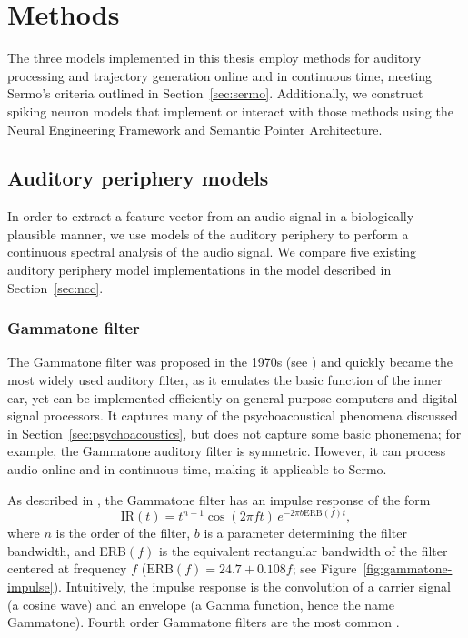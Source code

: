 \chapter{Methods}
\label{chapt:methods}

The three models implemented
in this thesis employ methods
for auditory processing
and trajectory generation
online and in continuous time,
meeting Sermo's criteria
outlined in Section~\ref{sec:sermo}.
Additionally,
we construct spiking neuron models
that implement or interact with those methods
using the Neural Engineering Framework
and Semantic Pointer Architecture.

\section{Auditory periphery models}
\label{sec:periphery-models}

In order to extract a feature vector
from an audio signal
in a biologically plausible manner,
we use models of the auditory periphery
to perform a continuous spectral analysis
of the audio signal.
We compare five existing
auditory periphery model implementations
in the model described in
Section~\ref{sec:ncc}.

\subsection{Gammatone filter}

The Gammatone filter was proposed
in the 1970s
(see \citealt{johannesma1972,deboer1975,patterson1976})
and quickly became
the most widely used auditory filter,
as it emulates the basic function
of the inner ear,
yet can be implemented efficiently
on general purpose computers
and digital signal processors.
It captures many of the
psychoacoustical phenomena discussed
in Section~\ref{sec:psychoacoustics},
but does not capture some basic phonemena;
for example, the Gammatone auditory filter is symmetric.
However,
it can process audio online
and in continuous time,
making it applicable to Sermo.


As described in \citet{patterson1976},
the Gammatone filter has
an impulse response of the form
\begin{equation}
  \text{IR}(t) = t^{n-1} \cos(2 \pi f t) \, e^{-2 \pi b \text{ERB}(f) t},
\end{equation}
where $n$ is the order of the filter,
$b$ is a parameter determining the filter bandwidth,
and ERB$(f)$ is the equivalent rectangular bandwidth
of the filter centered at frequency $f$
($\text{ERB}(f) = 24.7 + 0.108f$;
see Figure~\ref{fig:gammatone-impulse}).
Intuitively, the impulse response
is the convolution of a
carrier signal (a cosine wave)
and an envelope
(a Gamma function, hence the name Gammatone).
Fourth order Gammatone filters
are the most common
\citep{patterson1992}.

